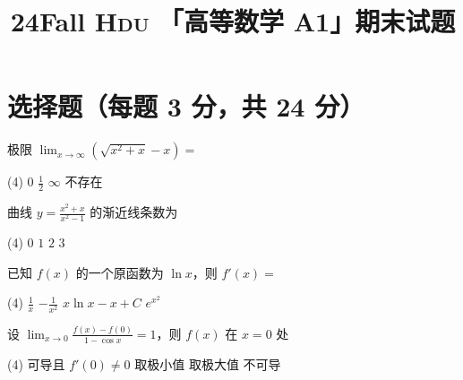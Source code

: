 \documentclass[quiet]{ctexart}
\title{\sffamily\bfseries 24Fall \textsc{Hdu} 「高等数学 A1」期末试题}
\author{} \date{}
\begin{document}
\maketitle

\section{选择题（每题 3 分，共 24 分）}

\begin{problem}
  极限 $\lim_{x \to \infty} (\sqrt{x^2 + x} - x) =$
  \begin{tasks}(4)
    \task $0$
    \task $\frac12$
    \task $\infty$
    \task 不存在
  \end{tasks}
\end{problem}
\begin{solution}

\end{solution}

\begin{problem}
  曲线 $y = \frac{x^2 + x}{x^2 - 1}$ 的渐近线条数为
  \begin{tasks}(4)
    \task $0$
    \task $1$
    \task $2$
    \task $3$
  \end{tasks}
\end{problem}
\begin{solution}
  
\end{solution}

\begin{problem}
  已知 $f(x)$ 的一个原函数为 $\ln x$，则 $f'(x) =$
  \begin{tasks}(4)
    \task $\frac1x$
    \task $-\frac1{x^2}$
    \task $x\ln x - x + C$
    \task $e^{x^2}$
  \end{tasks}
\end{problem}
\begin{solution}
  
\end{solution}

\begin{problem}
  设 $\lim_{x \to 0} \frac{f(x) - f(0)}{1 - \cos x} = 1$，则 $f(x)$ 在 $x = 0$ 处
  \begin{tasks}(4)
    \task 可导且 $f'(0) \neq 0$
    \task 取极小值
    \task 取极大值
    \task 不可导
  \end{tasks}
\end{problem}
\begin{solution}
  
\end{solution}
\end{document}
